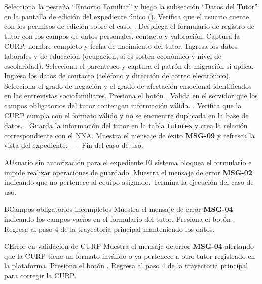 \begin{UCtrayectoria}
	\UCpaso[\UCactor] Selecciona la pestaña ``Entorno Familiar'' y luego la subsección ``Datos del Tutor'' en la pantalla de edición del expediente único ().
	\UCpaso Verifica que el usuario cuente con los permisos de edición sobre el caso. .
	\UCpaso Despliega el formulario de registro de tutor con los campos de datos personales, contacto y valoración.
	\UCpaso[\UCactor] Captura la CURP, nombre completo y fecha de nacimiento del tutor.
	\UCpaso[\UCactor] Ingresa los datos laborales y de educación (ocupación, si es sostén económico y nivel de escolaridad).
	\UCpaso[\UCactor] Selecciona el parentesco y captura el patrón de migración si aplica.
	\UCpaso[\UCactor] Ingresa los datos de contacto (teléfono y dirección de correo electrónico).
	\UCpaso[\UCactor] Selecciona el grado de negación y el grado de afectación emocional identificados en las entrevistas sociofamiliares.
	\UCpaso[\UCactor] Presiona el botón .
	\UCpaso Valida en el servidor que los campos obligatorios del tutor contengan información válida. .
	\UCpaso Verifica que la CURP cumpla con el formato válido y no se encuentre duplicada en la base de datos. .
	\UCpaso Guarda la información del tutor en la tabla \texttt{tutores} y crea la relación correspondiente con el NNA.
	\UCpaso Muestra el mensaje de éxito {\bf MSG-09} y refresca la vista del expediente.
	\UCpaso[] -- -- Fin del caso de uso.
\end{UCtrayectoria}

\begin{UCtrayectoriaA}{A}{Usuario sin autorización para el expediente}
	\UCpaso El sistema bloquea el formulario e impide realizar operaciones de guardado.
	\UCpaso Muestra el mensaje de error {\bf MSG-02} indicando que no pertenece al equipo asignado.
	\UCpaso Termina la ejecución del caso de uso.
\end{UCtrayectoriaA}

\begin{UCtrayectoriaA}{B}{Campos obligatorios incompletos}
	\UCpaso Muestra el mensaje de error {\bf MSG-04} indicando los campos vacíos en el formulario del tutor.
	\UCpaso[\UCactor] Presiona el botón .
	\UCpaso Regresa al paso 4 de la trayectoria principal manteniendo los datos.
\end{UCtrayectoriaA}

\begin{UCtrayectoriaA}{C}{Error en validación de CURP}
	\UCpaso Muestra el mensaje de error {\bf MSG-04} alertando que la CURP tiene un formato inválido o ya pertenece a otro tutor registrado en la plataforma.
	\UCpaso[\UCactor] Presiona el botón .
	\UCpaso Regresa al paso 4 de la trayectoria principal para corregir la CURP.
\end{UCtrayectoriaA}
